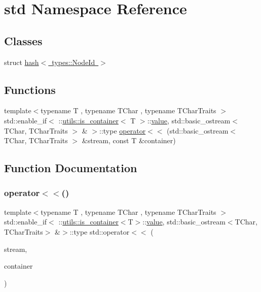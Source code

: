 \hypertarget{namespacestd}{}\section{std Namespace Reference}
\label{namespacestd}
\subsection*{Classes}
\begin{DoxyCompactItemize}
\item 
struct \mbox{\hyperlink{structstd_1_1hash_3_01types_1_1_node_id_01_4}{hash$<$ types\+::\+Node\+Id $>$}}
\end{DoxyCompactItemize}
\subsection*{Functions}
\begin{DoxyCompactItemize}
\item 
{\footnotesize template$<$typename T , typename T\+Char , typename T\+Char\+Traits $>$ }\\std\+::enable\+\_\+if$<$ \+::\mbox{\hyperlink{structutils_1_1is__container}{utils\+::is\+\_\+container}}$<$ T $>$\+::\mbox{\hyperlink{diffusion_8cpp_a4b41795815d9f3d03abfc739e666d5da}{value}}, std\+::basic\+\_\+ostream$<$ T\+Char, T\+Char\+Traits $>$ \& $>$\+::type \mbox{\hyperlink{namespacestd_ad453fd3d446695898da9f3fbb1fb0970}{operator$<$$<$}} (std\+::basic\+\_\+ostream$<$ T\+Char, T\+Char\+Traits $>$ \&stream, const T \&container)
\end{DoxyCompactItemize}


\subsection{Function Documentation}
\mbox{\label{namespacestd_ad453fd3d446695898da9f3fbb1fb0970}} 
\subsubsection{\texorpdfstring{operator$<$$<$()}{operator<<()}}
{\footnotesize\ttfamily template$<$typename T , typename T\+Char , typename T\+Char\+Traits $>$ \\
std\+::enable\+\_\+if$<$ \+::\mbox{\hyperlink{structutils_1_1is__container}{utils\+::is\+\_\+container}}$<$T$>$\+::\mbox{\hyperlink{diffusion_8cpp_a4b41795815d9f3d03abfc739e666d5da}{value}}, std\+::basic\+\_\+ostream$<$T\+Char, T\+Char\+Traits$>$ \&$>$\+::type std\+::operator$<$$<$ (\begin{DoxyParamCaption}\item[{std\+::basic\+\_\+ostream$<$ T\+Char, T\+Char\+Traits $>$ \&}]{stream,  }\item[{const T \&}]{container }\end{DoxyParamCaption})\hspace{0.3cm}{\ttfamily [inline]}}

